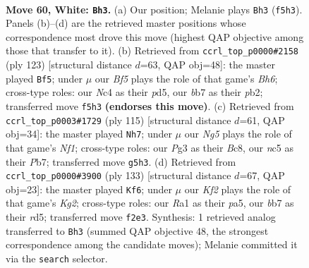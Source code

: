\documentclass[11pt]{article}
\begin{document}
\clearpage

\begin{figure}[p]\centering
\begin{subfigure}{0.46\textwidth}\centering
\resizebox{\linewidth}{!}{%
\newchessgame
\chessboard[
  setfen={8/Pb6/5k2/2n2BN1/1pN2P2/1Pn3P1/5K1P/R7 w - - 1 60},
  showmover=false,
  pgfstyle=straightmove, color=movearrow, markmove={f5-h3}
]}
\caption{}
\end{subfigure}\hfill
\begin{subfigure}{0.46\textwidth}\centering
\resizebox{\linewidth}{!}{%
\newchessgame
\chessboard[
  setfen={8/2p2r2/3p4/3P3k/1p2p3/5nKb/1P2N3/2Q5 b - - 1 62},
  showmover=false,
  pgfstyle=straightmove, color=movearrow, markmove={h3-f5}
]}
\caption{}
\end{subfigure}
\\[4pt]
\begin{subfigure}{0.46\textwidth}\centering
\resizebox{\linewidth}{!}{%
\newchessgame
\chessboard[
  setfen={1kb2n2/1p2K3/7P/3pN3/5p2/p1rB4/8/R7 b - - 1 58},
  showmover=false,
  pgfstyle=straightmove, color=movearrow, markmove={f8-h7}
]}
\caption{}
\end{subfigure}\hfill
\begin{subfigure}{0.46\textwidth}\centering
\resizebox{\linewidth}{!}{%
\newchessgame
\chessboard[
  setfen={8/6k1/6p1/P2R1p1p/4n2P/4K3/4N1P1/r7 b - - 0 67},
  showmover=false,
  pgfstyle=straightmove, color=movearrow, markmove={g7-f6}
]}
\caption{}
\end{subfigure}
\caption{\textbf{Move 60, White: \texttt{Bh3}.} (a) Our position; Melanie plays \texttt{Bh3} (\texttt{f5h3}). Panels (b)--(d) are the retrieved master positions whose correspondence most drove this move (highest QAP objective among those that transfer to it). (b) Retrieved from \texttt{ccrl\_top\_p0000\#2158} (ply 123) [structural distance $d$=63, QAP obj=48]: the master played \texttt{Bf5}; under $\mu$ our \emph{Bf5} plays the role of that game's \emph{Bh6}; cross-type roles: our \emph{N}c4 as their \emph{p}d5, our \emph{b}b7 as their \emph{p}b2; transferred move \texttt{f5h3} \textbf{(endorses this move)}. (c) Retrieved from \texttt{ccrl\_top\_p0003\#1729} (ply 115) [structural distance $d$=61, QAP obj=34]: the master played \texttt{Nh7}; under $\mu$ our \emph{Ng5} plays the role of that game's \emph{Nf1}; cross-type roles: our \emph{P}g3 as their \emph{B}c8, our \emph{n}c5 as their \emph{P}b7; transferred move \texttt{g5h3}. (d) Retrieved from \texttt{ccrl\_top\_p0000\#3900} (ply 133) [structural distance $d$=67, QAP obj=23]: the master played \texttt{Kf6}; under $\mu$ our \emph{Kf2} plays the role of that game's \emph{Kg2}; cross-type roles: our \emph{R}a1 as their \emph{p}a5, our \emph{b}b7 as their \emph{r}d5; transferred move \texttt{f2e3}. Synthesis: 1 retrieved analog transferred to \texttt{Bh3} (summed QAP objective 48, the strongest correspondence among the candidate moves); Melanie committed it via the \texttt{search} selector.}
\label{fig:thought-m118}
\end{figure}
\end{document}

